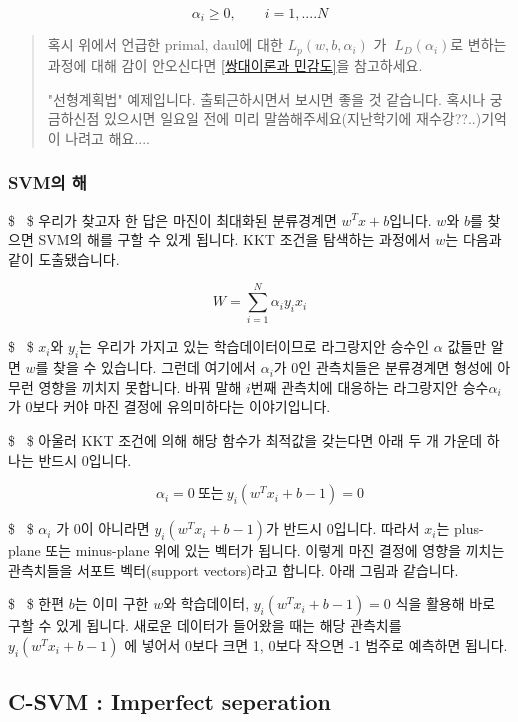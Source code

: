 \documentclass[11pt]{article}
\begin{document}
\[
\alpha_i \ge 0, \qquad i = 1, .... N
\]

\begin{quote}
혹시 위에서 언급한 primal, daul에 대한 \(L_p(w,b,\alpha_i)\) 가
\(\ L_D(\alpha_i)\)로 변하는 과정에 대해 감이 안오신다면
\href{http://secom.hanbat.ac.kr/or/ch04/right04.html}{{[}쌍대이론과
민감도{]}}을 참고하세요.

"선형계획법" 예제입니다. 출퇴근하시면서 보시면 좋을 것 같습니다. 혹시나
궁금하신점 있으시면 일요일 전에 미리 말씀해주세요(지난학기에
재수강??..)기억이 나려고 해요....
\end{quote}

\subsubsection{SVM의 해}\label{svmuxc758-uxd574}

\$ ~\$ 우리가 찾고자 한 답은 마진이 최대화된 분류경계면
\(w^Tx+b\)입니다. \(w\)와 \(b\)를 찾으면 SVM의 해를 구할 수 있게 됩니다.
KKT 조건을 탐색하는 과정에서 \(w\)는 다음과 같이 도출됐습니다.

\[
W =  \sum_{i=1}^N \alpha_iy_ix_i 
\]

\$ ~\$ \(x_i\)와 \(y_i\)는 우리가 가지고 있는 학습데이터이므로
라그랑지안 승수인 \(\alpha\) 값들만 알면 \(w\)를 찾을 수 있습니다.
그런데 여기에서 \(\alpha_i\)가 0인 관측치들은 분류경계면 형성에 아무런
영향을 끼치지 못합니다. 바꿔 말해 \(i\)번째 관측치에 대응하는 라그랑지안
승수\(\alpha_i\)가 0보다 커야 마진 결정에 유의미하다는 이야기입니다.

\$ ~\$ 아울러 KKT 조건에 의해 해당 함수가 최적값을 갖는다면 아래 두 개
가운데 하나는 반드시 0입니다.

    \[
\alpha_i = 0 \ 또는 \  y_i(w^Tx_i + b -1) = 0
\]

\$ ~\$ \(\alpha_i\) 가 0이 아니라면 \(y_i(w^Tx_i + b -1)\)가 반드시
0입니다. 따라서 \(x_i\)는 plus-plane 또는 minus-plane 위에 있는 벡터가
됩니다. 이렇게 마진 결정에 영향을 끼치는 관측치들을 서포트 벡터(support
vectors)라고 합니다. 아래 그림과 같습니다.

\$ ~\$ 한편 \(b\)는 이미 구한 \(w\)와 학습데이터,
\(y_i(w^Tx_i + b -1)=0\) 식을 활용해 바로 구할 수 있게 됩니다. 새로운
데이터가 들어왔을 때는 해당 관측치를 \(y_i(w^Tx_i + b -1)\) 에 넣어서
0보다 크면 1, 0보다 작으면 -1 범주로 예측하면 됩니다.

    \subsection{C-SVM : Imperfect
seperation}\label{c-svm-imperfect-seperation}


    
    
    
    
\end{document}
